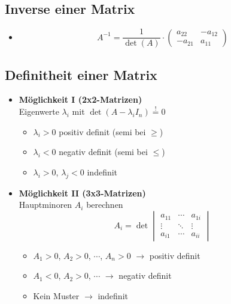 \documentclass[a3paper, 11pt, landscape]{scrartcl}
\begin{document}
\begin{multicols*}{3}
	\subsection{Inverse einer Matrix}
	\begin{itemize}
	    \item 
					\begin{equation*}
						A^{-1}=\frac{1}{\det(A)}\cdot
						\begin{pmatrix}
							a_{22} &-a_{12}\\
							-a_{21} &a_{11}
						\end{pmatrix}
					\end{equation*}
	\end{itemize}
	
	\subsection{Definitheit einer Matrix}
	\begin{itemize}
					\item \textbf{Möglichkeit I (2x2-Matrizen)}\\
					Eigenwerte $\lambda_i$ mit $\det(A-\lambda_i I_n) \overset{!}{=}0$
					\begin{itemize}
						\item $\lambda_i>0 $ positiv definit (semi bei $\ge$)
						\item $\lambda_i<0 $ negativ definit (semi bei $\le$)
						\item $\lambda_i>0$, $\lambda_j<0$ indefinit
					\end{itemize}
					\item \textbf{Möglichkeit II (3x3-Matrizen)}\\
					Hauptminoren $A_i$ berechnen
					\begin{equation*}
					A_i=\det
					\begin{vmatrix}
					a_{11} &\cdots &a_{1i}\\
					\vdots &\ddots &\vdots\\
					a_{i1} &\cdots &a_{ii}
					\end{vmatrix}
					\end{equation*}
					\begin{itemize}
						\item $A_1>0$, $A_2>0$, $\cdots$, $A_n>0$ $\rightarrow$ positiv definit
						\item $A_1<0$, $A_2>0$, $\cdots$ $\rightarrow$ negativ definit
						\item Kein Muster $\rightarrow$ indefinit
					\end{itemize}
				\end{itemize}
	

\end{multicols*}
\end{document}
